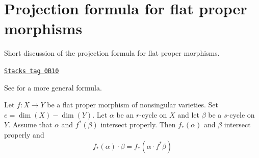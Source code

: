 \section{Projection formula for flat proper morphisms}
\label{intersection-section-projection-formula-flat}
Short discussion of the projection formula for flat proper morphisms.

\begin{lemma}
\label{intersection-lemma-projection-formula-flat}
\href{https://stacks.math.columbia.edu/tag/0B10}{\texttt{Stacks tag 0B10}}

\begin{reference}
See \cite[Chapter V, C), Section 7, formula (10)]{Serre_algebre_locale}
for a more general formula.
\end{reference}
Let $f : X \to Y$ be a flat proper morphism of nonsingular varieties.
Set $e = \dim(X) - \dim(Y)$. Let $\alpha$ be an $r$-cycle on $X$ and let
$\beta$ be a $s$-cycle on $Y$. Assume that $\alpha$ and $f^*(\beta)$ intersect
properly. Then $f_*(\alpha)$ and $\beta$ intersect properly and
$$
f_*(\alpha) \cdot \beta = f_*( \alpha \cdot f^*\beta)
$$
\end{lemma}

